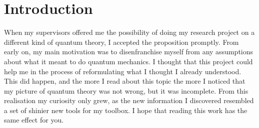 \documentclass[10pt, a4paper, singlespacing, headsepline]{report}
\begin{document}
\chapter{Introduction}\label{Introduction}
When my supervisors offered me the possibility of doing my research project on a different kind of quantum theory, I accepted the proposition promptly. 
From early on, my main motivation was to disenfranchise myself from any assumptions about what it meant to do quantum mechanics. I thought that this project could help me in the process of reformulating what I thought I already understood. This did happen, and the more I read about this topic the more I noticed that my picture of quantum theory was not wrong, but it was incomplete. From this realisation my curiosity only grew, as the new information I discovered resembled a set of shinier new tools for my toolbox. I hope that reading this work has the same effect for you.
\end{document}
